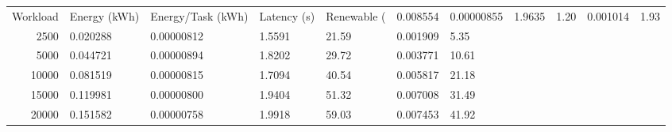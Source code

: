 \begin{tabular}{rllllll}
\toprule
Workload & Energy (kWh) & Energy/Task (kWh) & Latency (s) & Renewable (%
 & 0.008554 & 0.00000855 & 1.9635 & 1.20 & 0.001014 & 1.93 \\
2500 & 0.020288 & 0.00000812 & 1.5591 & 21.59 & 0.001909 & 5.35 \\
5000 & 0.044721 & 0.00000894 & 1.8202 & 29.72 & 0.003771 & 10.61 \\
10000 & 0.081519 & 0.00000815 & 1.7094 & 40.54 & 0.005817 & 21.18 \\
15000 & 0.119981 & 0.00000800 & 1.9404 & 51.32 & 0.007008 & 31.49 \\
20000 & 0.151582 & 0.00000758 & 1.9918 & 59.03 & 0.007453 & 41.92 \\
\bottomrule
\end{tabular}
